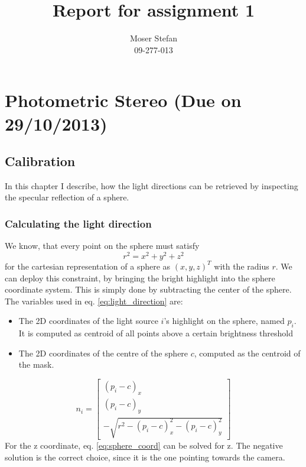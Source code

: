 \documentclass{paper}
\title{Report for assignment 1}
\author{Moser Stefan\\09-277-013}
\begin{document}
\maketitle


%

\section{Photometric Stereo (Due on 29/10/2013)}

\subsection{Calibration}
In this chapter I describe, how the light directions can be retrieved by 
inspecting the specular reflection of a sphere.

\subsubsection{Calculating the light direction} 
We know, that every point on the sphere must satisfy
\begin{equation}
	r^2 = x^2 + y^2 + z^2
\label{eq:sphere_coord}
\end{equation}
for the cartesian representation of a sphere as $(x,y,z)^T$ with the radius $r$. We can deploy this constraint, by bringing the bright
 highlight into the sphere coordinate system. This is simply done 
 by subtracting the center of the sphere. The variables used in eq. \ref{eq:light_direction} are:
\begin{itemize}
\item The 2D coordinates of the light source $i$'s highlight on the sphere, named $p_i$. It is computed as centroid of all points above a certain brightness threshold
\item The 2D coordinates of the centre of the sphere $c$, computed as the centroid of the mask.
\end{itemize}
\begin{equation}
	n_i = 
	\left[ 
	\begin{array}{c}
	(p_i - c)_x \\
	(p_i - c)_y \\
	-\sqrt{r^2 - (p_i - c)_x^2 - (p_i - c)_y^2}
\end{array} 
\right] 
\label{eq:light_direction}
\end{equation}
For the z coordinate, eq. \ref{eq:sphere_coord} can be solved for z. The negative solution is the correct choice, since it is the one pointing towards the camera.
\end{document}
